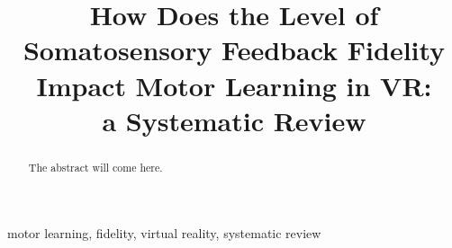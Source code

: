 \documentclass[conference]{IEEEtran}
\begin{document}
\title{How Does the Level of Somatosensory Feedback Fidelity Impact Motor Learning in VR: \\a Systematic Review}

\author{
\and
{}
\and
{}
}

\maketitle

\begin{abstract}
The abstract will come here.
\end{abstract}

\begin{IEEEkeywords}
motor learning, fidelity, virtual reality, systematic review
\end{IEEEkeywords}










\newpage

\end{document}

